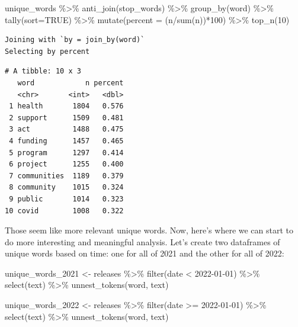 \documentclass[
  letterpaper,
  DIV=11,
  numbers=noendperiod]{scrreprt}
\newenvironment{Shaded}{\begin{snugshade}}{\end{snugshade}}
\newcommand{\AttributeTok}[1]{\textcolor[rgb]{0.40,0.45,0.13}{#1}}
\newcommand{\ConstantTok}[1]{\textcolor[rgb]{0.56,0.35,0.01}{#1}}
\newcommand{\DecValTok}[1]{\textcolor[rgb]{0.68,0.00,0.00}{#1}}
\newcommand{\FunctionTok}[1]{\textcolor[rgb]{0.28,0.35,0.67}{#1}}
\newcommand{\NormalTok}[1]{\textcolor[rgb]{0.00,0.23,0.31}{#1}}
\newcommand{\OtherTok}[1]{\textcolor[rgb]{0.00,0.23,0.31}{#1}}
\newcommand{\SpecialCharTok}[1]{\textcolor[rgb]{0.37,0.37,0.37}{#1}}
\newcommand{\StringTok}[1]{\textcolor[rgb]{0.13,0.47,0.30}{#1}}
\begin{document}
\begin{Shaded}
\begin{Highlighting}[]
\NormalTok{unique\_words }\SpecialCharTok{\%\textgreater{}\%}
  \FunctionTok{anti\_join}\NormalTok{(stop\_words) }\SpecialCharTok{\%\textgreater{}\%}
  \FunctionTok{group\_by}\NormalTok{(word) }\SpecialCharTok{\%\textgreater{}\%}
  \FunctionTok{tally}\NormalTok{(}\AttributeTok{sort=}\ConstantTok{TRUE}\NormalTok{) }\SpecialCharTok{\%\textgreater{}\%}
  \FunctionTok{mutate}\NormalTok{(}\AttributeTok{percent =}\NormalTok{ (n}\SpecialCharTok{/}\FunctionTok{sum}\NormalTok{(n))}\SpecialCharTok{*}\DecValTok{100}\NormalTok{) }\SpecialCharTok{\%\textgreater{}\%}
  \FunctionTok{top\_n}\NormalTok{(}\DecValTok{10}\NormalTok{)}
\end{Highlighting}
\end{Shaded}

\begin{verbatim}
Joining with `by = join_by(word)`
Selecting by percent
\end{verbatim}

\begin{verbatim}
# A tibble: 10 x 3
   word            n percent
   <chr>       <int>   <dbl>
 1 health       1804   0.576
 2 support      1509   0.481
 3 act          1488   0.475
 4 funding      1457   0.465
 5 program      1297   0.414
 6 project      1255   0.400
 7 communities  1189   0.379
 8 community    1015   0.324
 9 public       1014   0.323
10 covid        1008   0.322
\end{verbatim}

Those seem like more relevant unique words. Now, here's where we can
start to do more interesting and meaningful analysis. Let's create two
dataframes of unique words based on time: one for all of 2021 and the
other for all of 2022:

\begin{Shaded}
\begin{Highlighting}[]
\NormalTok{unique\_words\_2021 }\OtherTok{\textless{}{-}}\NormalTok{ releases }\SpecialCharTok{\%\textgreater{}\%}
  \FunctionTok{filter}\NormalTok{(date }\SpecialCharTok{\textless{}} \StringTok{\textquotesingle{}2022{-}01{-}01\textquotesingle{}}\NormalTok{) }\SpecialCharTok{\%\textgreater{}\%}
  \FunctionTok{select}\NormalTok{(text) }\SpecialCharTok{\%\textgreater{}\%}
  \FunctionTok{unnest\_tokens}\NormalTok{(word, text)}

\NormalTok{unique\_words\_2022 }\OtherTok{\textless{}{-}}\NormalTok{ releases }\SpecialCharTok{\%\textgreater{}\%}
  \FunctionTok{filter}\NormalTok{(date }\SpecialCharTok{\textgreater{}=} \StringTok{\textquotesingle{}2022{-}01{-}01\textquotesingle{}}\NormalTok{) }\SpecialCharTok{\%\textgreater{}\%}
  \FunctionTok{select}\NormalTok{(text) }\SpecialCharTok{\%\textgreater{}\%}
  \FunctionTok{unnest\_tokens}\NormalTok{(word, text)}
\end{Highlighting}
\end{Shaded}
\end{document}
